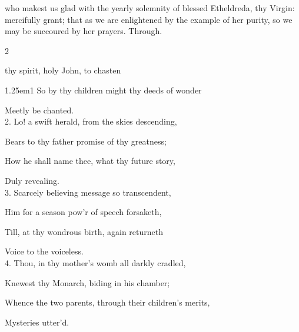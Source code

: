 \clearpage
{}

\memorialCollect
{} who makest us glad with the yearly solemnity of blessed Etheldreda, thy Virgin: mercifully grant; that as we are enlightened by the example of her purity, so we may be succoured by her prayers. Through.


\label{StJohnBaptist}


\begin{paracol}{2}
\sloppy

\firstEvensong
{}

\firstEvensongHymn
{} thy spirit, holy John, to chasten


\begin{hangparas}{1.25em}{1}
So by thy children might thy deeds of wonder

Meetly be chanted.\\

2. Lo! a swift herald, from the skies descending,

Bears to thy father promise of thy greatness;

How he shall name thee, what thy future story,

Duly revealing.\\

3. Scarcely believing message so transcendent,

Him for a season pow'r of speech forsaketh,

Till, at thy wondrous birth, again returneth

Voice to the voiceless.\\

4. Thou, in thy mother’s womb all darkly cradled,

Knewest thy Monarch, biding in his chamber;

Whence the two parents, through their children’s merits,

Mysteries utter'd.\\


\end{hangparas}
\end{paracol}

